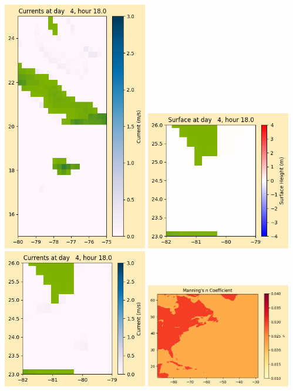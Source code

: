 \documentclass[11pt]{article}
\begin{document}
\includegraphics[width=0.475\textwidth]{frame0031fig1008.png}
\vskip 10pt 
\includegraphics[width=0.475\textwidth]{frame0031fig1009.png}
\includegraphics[width=0.475\textwidth]{frame0031fig1010.png}
\vskip 10pt 
\includegraphics[width=0.475\textwidth]{frame0031fig1011.png}
\end{document}
